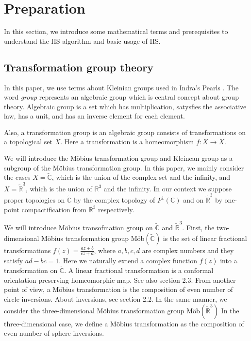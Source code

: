 
\section{Preparation}

In this section, we introduce some mathematical terms and prerequisites
to understand the IIS algorithm and basic usage of IIS.

\subsection{Transformation group theory}

In this paper, we use terms about Kleinian groups used in Indra's
Pearls \cite{MumfordSeriesWright200204}.
The word \textit{group} represents an algebraic group which is
central concept about group theory.
Algebraic group is a set which has multiplication, satysfies the
associative law, has a unit, and has an inverse element for each
element.

Also, a transformation group is an algebraic group consists of transformations 
on a topological set $X$.  Here a transformation is a homeomorphism
$f:X \to X$.

We will introduce the M\"obius transformation group and Kleinean group
as a subgroup of the M\"obius transformation group. 
In this paper, we mainly consider the cases $X=\tilde{\mathbb{C}}$,
which is the union of the complex set and the infinity, 
and $X=\tilde{ \mathbb{R} }^3$, which is the union of $\mathbb{R}^3$ and the infinity.
In our context we suppose proper topologies on $\tilde{\mathbb{C}}$ 
by the complex topology of $P^1(\mathbb{C})$ and on $\tilde{ \mathbb{R} }^3$
by one-point compactification from $\mathbb{R}^3$ respectively.

We will introduce M\"obius transofmation group on $\tilde{\mathbb{C}}$ and $\tilde{ \mathbb{R} }^3$.  
First, the two-dimensional M\"obius transformation group
\textrm{M\"ob}$(\tilde{\mathbb{C}})$ is the set of linear fractional transformations $f(z)=\frac{az+b}{cz+d}$, 
where $a,b,c,d$ are complex numbers and they satisfy $ad-bc = 1$. Here we naturally extend a complex function $f(z)$ 
into a transformation on $\tilde{\mathbb{C}}$.  
A linear fractional transformation is a conformal orientation-preserving homeomorphic map.
See also section 2.3.
From another point of view, a M\"obius transformation is the composition of even number of circle inversions.  
About inversions, see section 2.2.
In the same manner, we consider the three-dimensional M\"obius
transformation group \textrm{M\"ob}$(\tilde{\mathbb{R}}^3)$
In the three-dimensional case, we define a M\"obius transformation as
the composition of even number of sphere inversions.

